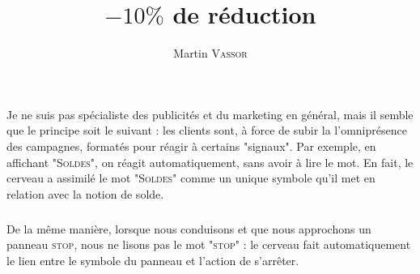 \documentclass{article}
\title{$-10\%$ de réduction}
\author{Martin \textsc{Vassor}}
\begin{document}
\maketitle

\paragraph*{}
Je ne suis pas spécialiste des publicités et du marketing en général, mais il 
semble que le principe soit le suivant : les clients sont, à force de subir la 
l'omniprésence des campagnes, formatés pour réagir à certains "signaux". 
Par exemple, en affichant "\textsc{Soldes}", on réagit automatiquement, sans 
avoir à lire le mot. En fait, le cerveau a assimilé le mot "\textsc{Soldes}" 
comme un unique symbole qu'il met en relation avec la notion de solde.
\subparagraph*{}
De la même manière, lorsque nous conduisons et que nous approchons un panneau 
\textsc{stop}, nous ne lisons pas le mot "\textsc{stop}" : le cerveau fait 
automatiquement le lien entre le symbole du panneau et l'action de s'arrêter.
\end{document}
